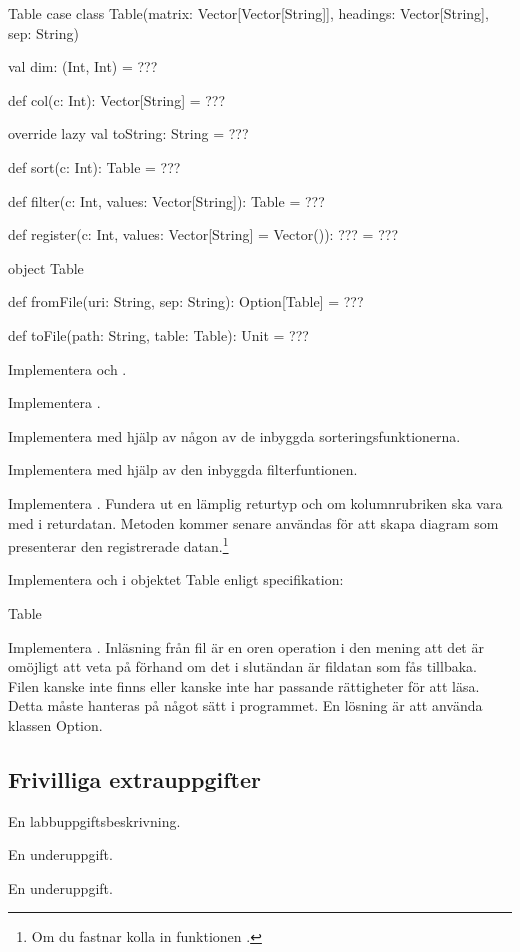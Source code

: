 \begin{ScalaSpec}{Table}
case class Table(matrix: Vector[Vector[String]], headings: Vector[String], sep: String) {

  val dim: (Int, Int) = ???

  def col(c: Int): Vector[String] = ???

  override lazy val toString: String = ???

  def sort(c: Int): Table = ???

  def filter(c: Int, values: Vector[String]): Table = ???

  def register(c: Int, values: Vector[String] = Vector()): ??? = ???
}

object Table {

  def fromFile(uri: String, sep: String): Option[Table] = ???

  def toFile(path: String, table: Table): Unit = ???
}
\end{ScalaSpec}

\Subtask Implementera  och .

\Subtask Implementera .%

\Subtask Implementera  med hjälp av någon av de inbyggda sorteringsfunktionerna.

\Subtask Implementera  med hjälp av den inbyggda filterfuntionen.

\Subtask Implementera . Fundera ut en lämplig returtyp och om kolumnrubriken ska vara med i returdatan. Metoden kommer senare användas för att skapa diagram som presenterar den registrerade datan.\footnote{Om du fastnar kolla in funktionen .}

\Task Implementera  och  i objektet Table enligt specifikation:
\begin{ScalaSpec}{Table}

\end{ScalaSpec}

\Subtask Implementera . Inläsning från fil är en oren operation i den mening att det är omöjligt att veta på förhand om det i slutändan är fildatan som fås tillbaka. Filen kanske inte finns eller kanske inte har passande rättigheter för att läsa. Detta måste hanteras på något sätt i programmet. En lösning är att använda klassen Option.
\subsection{Frivilliga extrauppgifter}
    
\Task En labbuppgiftsbeskrivning.

\Subtask En underuppgift.

\Subtask En underuppgift.